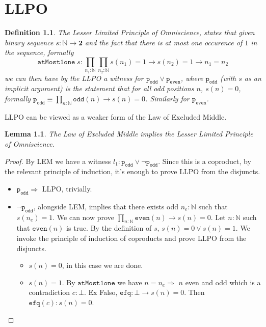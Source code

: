 \documentclass[12pt]{report}
\newtheorem{defn}[thm]{Definition}
\newtheorem{lem}[thm]{Lemma}
\begin{document}
\chapter{LLPO}
\begin{defn} 
The Lesser Limited Principle of Omniscience, states that given binary sequence $s : \mathbb{N} \rightarrow \mathbf{2}$ and the fact that there is at most one occurence of $1$ in the sequence, formally 
$$\mathtt{atMost1one}\; s :\prod_{n_1 : \mathbb{N}} \prod_{n_2 : \mathbb{N}} s(n_1) = 1 \rightarrow s(n_2)= 1 \rightarrow n_1 = n_2$$
we can then have by the LLPO a witness for $\mathtt{p_{odd}} \vee \mathtt{p_{even}}$, where $\mathtt{p_{odd}}$ (with $s$ as an implicit argument) is the statement that for all odd positions $n$, $s(n) = 0$, formally $\mathtt{p_{odd}} \equiv \prod_{n : \mathbb{N}} \mathtt{odd}(n) \rightarrow s(n) = 0$. 
Similarly for $\mathtt{p_{even}}$. 
\end{defn}
LLPO can be viewed as a weaker form of the Law of Excluded Middle. 

\begin{lem} 
The Law of Excluded Middle implies the Lesser Limited Principle of Omniscience.
\end{lem}

\begin{proof}
By LEM we have a witness $ l_1 :\mathtt{p_{odd}} \vee \neg \mathtt{p_{odd}}$. 
Since this is a coproduct, by the relevant principle of induction, it's enough to prove LLPO from the disjuncts. 
\begin{itemize}
	\item $\mathtt{p_{odd}} \Rightarrow $ LLPO, trivially.

	\item $\neg \mathtt{p_{odd}}$, alongside LEM, implies that there exists odd $n_e : \mathbb{N}$ such that $s(n_e) = 1$. 
	We can now prove $\prod_{n : \mathbb{N}} \mathtt{even}(n) \rightarrow s(n) = 0$. 
	Let $n : \mathbb{N}$ such that $\mathtt{even}(n)$ is true. 
	By the definition of $s$, $s(n) = 0 \vee s(n) = 1$.
	We invoke the principle of induction of coproducts and prove LLPO from the disjuncts. 
	\begin{itemize}
		\item $s(n) = 0$, in this case we are done.
		\item $s(n) = 1$. 
		By $\mathtt{atMost1one}$ we have $n = n_e \Rightarrow $ $n$ even and odd which is a contradiction $c : \bot$. 
		Ex Falso,  $\mathtt{efq} : \bot \rightarrow s(n) = 0$. 
		Then $\mathtt{efq}(c) : s(n) = 0$.
	\end{itemize}
\end{itemize}
\end{proof}
\end{document}

